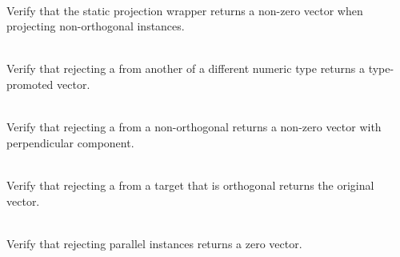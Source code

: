 \begin{DoxyRefList}
\item[{\parbox[t]{\linewidth}{Member \doxylink{group___f_g_m___vec4___proj_ga33f55fa752f078c95542527e32a16d04}{Vector4\+DProjection\+\_\+\+Static\+Wrapper\+\_\+\+Non\+Orthogonal\+Projection\+Returns\+Non\+Zero\+Vector} ()}}]\hfill \\
\label{test__test000131}%
%
Verify that the  static projection wrapper returns a non-\/zero vector when projecting non-\/orthogonal instances.  
\item[{\parbox[t]{\linewidth}{Member \doxylink{group___f_g_m___vec4___rej_ga92f907361e059da4f4f1ed52f8e4838d}{Vector4\+DRejection\+\_\+\+Mixed\+Type\+Rejection\+Promotes\+Type} ()}}]\hfill \\
\label{test__test000145}%
%
Verify that rejecting a  from another  of a different numeric type returns a type-\/promoted vector.  
\item[{\parbox[t]{\linewidth}{Member \doxylink{group___f_g_m___vec4___rej_gadc89a1a646ead7fb6e20b47b22af43f9}{Vector4\+DRejection\+\_\+\+Non\+Orthogonal\+Rejection\+Returns\+Non\+Zero\+Vector} ()}}]\hfill \\
\label{test__test000141}%
%
Verify that rejecting a  from a non-\/orthogonal  returns a non-\/zero vector with perpendicular component.  
\item[{\parbox[t]{\linewidth}{Member \doxylink{group___f_g_m___vec4___rej_gadf87939b01d28a0b7aa3bbef247225bc}{Vector4\+DRejection\+\_\+\+Orthogonal\+Rejection\+Returns\+Original\+Vector} ()}}]\hfill \\
\label{test__test000140}%
%
Verify that rejecting a  from a target  that is orthogonal returns the original vector.  
\item[{\parbox[t]{\linewidth}{Member \doxylink{group___f_g_m___vec4___rej_ga4842b0d1ce3435849da34afd6375e0e9}{Vector4\+DRejection\+\_\+\+Parallel\+Vectors\+Returns\+Zero\+Vector} ()}}]\hfill \\
\label{test__test000135}%
%
Verify that rejecting parallel  instances returns a zero vector.  

\end{DoxyRefList}
